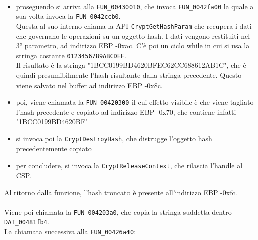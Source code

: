 \documentclass[12pt]{extarticle}
\begin{document}
$$\begin{itemize}
    \begin{itemize}
        \item l'API aggiunge dei dati ad uno specifico hash object, in questo caso quello aperto in precedenza
        \item i dati aggiunti sono proprio la stringa "\{a04afba1-0000-0000-0000100000000000\}"
    \end{itemize}
    \item proseguendo si arriva alla \texttt{FUN\_00430010}, che invoca \texttt{FUN\_0042fa00} la quale a sua volta invoca la \texttt{FUN\_0042ccb0}.\\Questa al suo interno chiama la API \texttt{CryptGetHashParam} che recupera i dati che governano le operazioni su un oggetto hash. I dati vengono restituiti nel 3° parametro, ad indirizzo EBP -0xac. C'è poi un ciclo while in cui si usa la stringa costante \texttt{0123456789ABCDEF}.\\ Il risultato è la stringa "1BCC0199BD4620BFEC62CC688612AB1C", che è quindi presumibilmente l'hash risultante dalla stringa precedente. Questo viene salvato nel buffer ad indirizzo EBP -0x8c.
    \item poi, viene chiamata la \texttt{FUN\_00420300} il cui effetto visibile è che viene tagliato l'hash precedente e copiato ad indirizzo EBP -0x70, che contiene infatti "1BCC0199BD4620BF"
    \item si invoca poi la \texttt{CryptDestroyHash}, che distrugge l'oggetto hash precedentemente copiato
    \item per concludere, si invoca la \texttt{CryptReleaseContext}, che rilascia l'handle al CSP.
\end{itemize}
Al ritorno dalla funzione, l'hash troncato è presente all'indirizzo EBP -0xfc.\\\\Viene poi chiamata la \texttt{FUN\_004203a0}, che copia la stringa suddetta dentro \texttt{DAT\_00481fb4}.\\La chiamata successiva alla \texttt{FUN\_00426a40}: 
\end{document}
